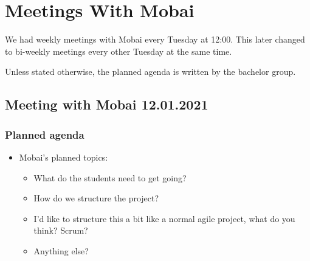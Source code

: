 \chapter{Meetings With Mobai}
\label{appendix:Mobai}

We had weekly meetings with Mobai every Tuesday at 12:00. This later changed to bi-weekly meetings every other Tuesday at the same time.

Unless stated otherwise, the planned agenda is written by the bachelor group.

\section*{Meeting with Mobai 12.01.2021}
\subsection*{Planned agenda}
\begin{itemize}
    \item Mobai’s planned topics:
    \begin{itemize}
        \item What do the students need to get going?
        \item How do we structure the project?
        \item I’d like to structure this a bit like a normal agile project, what do you think? Scrum?
        \item Anything else?
    \end{itemize}
\end{itemize}

